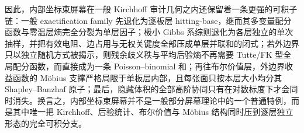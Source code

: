 \noindent
因此，内部坐标束屏幕在一般 Kirchhoff 审计几何之内还保留着一条更强的可积子链：一般 exactification family 先退化为逐板层 hitting-base，继而其多变量配分函数与零温层熵完全分裂为单层因子；极小 Gibbs 系综则退化为各层独立的单次抽样，并把有效电阻、边占用与无权关键度全部压成单层并联和的闭式；若外边界只以独立随机方式被揭示，则残余歧义秩与平均后验熵不再需要 Tutte/FK 型全局配分函数，而直接成为一条 Poisson--binomial 和；再往布尔价值层，外边界收益函数的 Möbius 支撑严格局限于单板层内部，且每张面只按本层大小均分其 Shapley--Banzhaf 原子；最后，隐藏体积的全部高阶协同只有在对数标度下才会同时消失。换言之，内部坐标束屏幕并不是一般部分屏幕理论中的一个普通特例，而是其中唯一把 Kirchhoff、后验统计、布尔价值与 Möbius 结构同时压到逐层独立形态的完全可积分支。

\endinput
